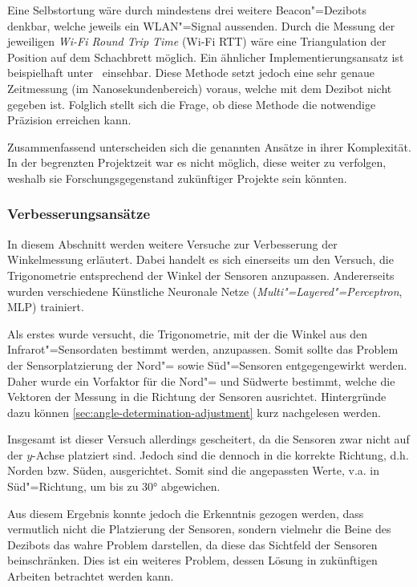 Eine Selbstortung wäre durch mindestens drei weitere Beacon"=Dezibots denkbar, welche jeweils ein WLAN"=Signal aussenden. Durch die Messung der jeweiligen \emph{Wi-Fi Round Trip Time} (Wi-Fi RTT) wäre eine Triangulation der Position auf dem Schachbrett möglich. Ein ähnlicher Implementierungsansatz ist beispielhaft unter~\cite{espressifsystemsshanghaico.ltdFTMExample2024} einsehbar. Diese Methode setzt jedoch eine sehr genaue Zeitmessung (im Nanosekundenbereich) voraus, welche mit dem Dezibot nicht gegeben ist. Folglich stellt sich die Frage, ob diese Methode die notwendige Präzision erreichen kann.


Zusammenfassend unterscheiden sich die genannten Ansätze in ihrer Komplexität. In der begrenzten Projektzeit war es nicht möglich, diese weiter zu verfolgen, weshalb sie Forschungsgegenstand zukünftiger Projekte sein könnten.


\subsubsection{Verbesserungsansätze}
\label{sec:ir-rotation-improvements}

In diesem Abschnitt werden weitere Versuche zur Verbesserung der Winkelmessung erläutert. Dabei handelt es sich einerseits um den Versuch, die Trigonometrie entsprechend der Winkel der Sensoren anzupassen. Andererseits wurden verschiedene Künstliche Neuronale Netze (\emph{Multi"=Layered"=Perceptron}, MLP) trainiert.


Als erstes wurde versucht, die Trigonometrie, mit der die Winkel aus den Infrarot"=Sensordaten bestimmt werden, anzupassen. Somit sollte das Problem der Sensorplatzierung der Nord"= sowie Süd"=Sensoren entgegengewirkt werden. Daher wurde ein Vorfaktor für die Nord"= und Südwerte bestimmt, welche die Vektoren der Messung in die Richtung der Sensoren ausrichtet. Hintergründe dazu können \autoref{sec:angle-determination-adjustment} kurz nachgelesen werden.

Insgesamt ist dieser Versuch allerdings gescheitert, da die Sensoren zwar nicht auf der $y$-Achse platziert sind. Jedoch sind die dennoch in die korrekte Richtung, d.h. Norden bzw. Süden, ausgerichtet. Somit sind die angepassten Werte, v.a. in Süd"=Richtung, um bis zu 30° abgewichen.

Aus diesem Ergebnis konnte jedoch die Erkenntnis gezogen werden, dass vermutlich nicht die Platzierung der Sensoren, sondern vielmehr die Beine des Dezibots das wahre Problem darstellen, da diese das Sichtfeld der Sensoren beinschränken. Dies ist ein weiteres Problem, dessen Lösung in zukünftigen Arbeiten betrachtet werden kann.


